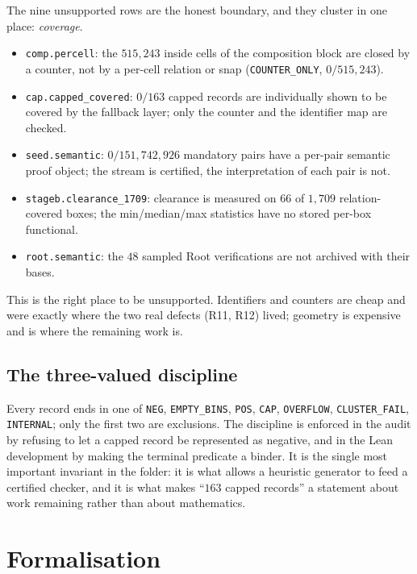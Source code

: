 \documentclass[10pt]{article}
\theoremstyle{definition}
\newcommand{\file}[1]{\texttt{\small #1}}
\begin{document}
The nine unsupported rows are the honest boundary, and they cluster in one place: \emph{coverage}.
\begin{itemize}[leftmargin=1.2em,itemsep=1pt]
\item \file{comp.percell}: the $515{,}243$ inside cells of the composition block are closed by a
counter, not by a per-cell relation or snap (\texttt{COUNTER\_ONLY}, $0/515{,}243$).
\item \file{cap.capped\_covered}: $0/163$ capped records are individually shown to be covered by the
fallback layer; only the counter and the identifier map are checked.
\item \file{seed.semantic}: $0/151{,}742{,}926$ mandatory pairs have a per-pair semantic proof object;
the stream is certified, the interpretation of each pair is not.
\item \file{stageb.clearance\_1709}: clearance is measured on $66$ of $1{,}709$ relation-covered boxes;
the min/median/max statistics have no stored per-box functional.
\item \file{root.semantic}: the $48$ sampled Root verifications are not archived with their bases.
\end{itemize}
This is the right place to be unsupported. Identifiers and counters are cheap and were exactly where
the two real defects (R11, R12) lived; geometry is expensive and is where the remaining work is.

\subsection{The three-valued discipline}
Every record ends in one of \texttt{NEG}, \texttt{EMPTY\_BINS}, \texttt{POS}, \texttt{CAP},
\texttt{OVERFLOW}, \texttt{CLUSTER\_FAIL}, \texttt{INTERNAL}; only the first two are exclusions. The
discipline is enforced in the audit by refusing to let a capped record be represented as negative, and
in the Lean development by making the terminal predicate a binder. It is the single most important
invariant in the folder: it is what allows a heuristic generator to feed a certified checker, and it is
what makes ``$163$ capped records'' a statement about work remaining rather than about mathematics.

\section{Formalisation}
\end{document}
